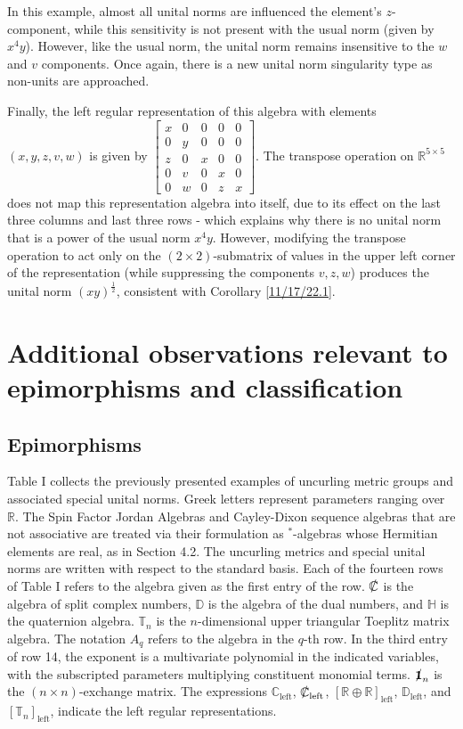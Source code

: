\documentclass{amsart}
\numberwithin{equation}{section}
\theoremstyle{definition}
\numberwithin{theorem}{section}
\begin{document}
In this example, almost all unital norms are influenced the element's $z$-component, while this sensitivity is not present with the usual norm (given by $x^4y$).  However, like the usual norm,  the unital norm remains insensitive to the $w$ and $v$ components.  Once again, there is a new unital norm singularity type as non-units are approached.  

Finally, the left regular representation of this algebra with elements $(x,y,z,v,w)$ is given by $ \left[
\begin{array}{ccccc}
x & 0 & 0 & 0 & 0   \\
0 & y & 0 & 0 & 0 \\
z & 0 &  x & 0 & 0  \\
0 & v &  0 & x & 0  \\
0 & w &  0 & z & x
\end{array}
\right].$
The transpose operation on $\mathbb{R}^{5\times 5}$ does not map this representation algebra into itself, due to its effect on the last three columns and last three rows - which explains why there is no unital norm that is a power of the usual norm $x^4y$.  However, modifying the transpose operation to act only on the $(2\times 2)$-submatrix of values in the upper left corner of the representation (while suppressing the components $v,z,w$) produces the unital norm $(xy)^\frac{1}{2}$, consistent with Corollary \ref{11/17/22.1}.
 
\section{Additional observations relevant to epimorphisms and classification}

\subsection{Epimorphisms} Table I collects the previously presented examples of uncurling metric groups and associated special unital norms.  Greek letters represent parameters ranging over $\mathbb{R}$.  The Spin Factor Jordan Algebras and Cayley-Dixon sequence algebras that are not associative are treated via their formulation as \mbox{$^*$-algebras} whose Hermitian elements are real, as in Section 4.2. The uncurling metrics and special unital norms are written with respect to the standard basis.  Each of the fourteen rows of Table I refers to the algebra given as the first entry of the row.  $\slashed{\mathbb{C}}$ is the algebra of split complex numbers, $\mathbb{D}$ is the algebra of the dual numbers, and $\mathbb{H}$ is the quaternion algebra.  $\mathbb{T}_n$ is the $n$-dimensional upper triangular Toeplitz matrix algebra.  The notation $A_q$ refers to the algebra in the $q$-th row.  In the third entry of row 14, the exponent is a multivariate polynomial in the indicated variables, with the subscripted parameters multiplying constituent monomial terms.  $\slashed{\mathbf{1}}_n$ is the $(n\times n)$-exchange matrix.  The expressions $\mathbb{C}_\text{left}$, $\slashed{\mathbb{C}}_\text{left}$, $[\mathbb{R}\oplus\mathbb{R}]_\text{left}$, $\mathbb{D}_\text{left}$, and $[\mathbb{T}_n]_\text{left}$, indicate the left regular representations.  
\end{document}
